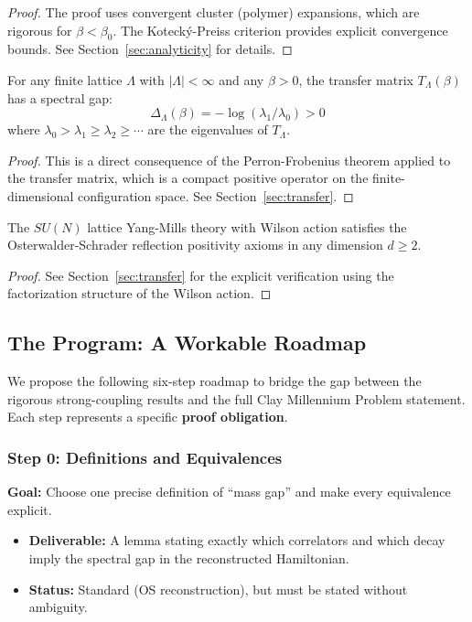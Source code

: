 \begin{proof}
The proof uses convergent cluster (polymer) expansions, which are rigorous for $\beta < \beta_0$. The Koteck\'y-Preiss criterion provides explicit convergence bounds. See Section~\ref{sec:analyticity} for details.
\end{proof}

\begin{theorem}
\label{thm:finite-volume-gap}
For any finite lattice $\Lambda$ with $|\Lambda| < \infty$ and any $\beta > 0$, the transfer matrix $T_\Lambda(\beta)$ has a spectral gap:
\[
\Delta_\Lambda(\beta) = -\log(\lambda_1/\lambda_0) > 0
\]
where $\lambda_0 > \lambda_1 \geq \lambda_2 \geq \cdots$ are the eigenvalues of $T_\Lambda$.
\end{theorem}

\begin{proof}
This is a direct consequence of the Perron-Frobenius theorem applied to the transfer matrix, which is a compact positive operator on the finite-dimensional configuration space. See Section~\ref{sec:transfer}.
\end{proof}

\begin{theorem}
\label{thm:rp-intro}
The $SU(N)$ lattice Yang-Mills theory with Wilson action satisfies the Osterwalder-Schrader reflection positivity axioms in any dimension $d \geq 2$.
\end{theorem}

\begin{proof}
See Section~\ref{sec:transfer} for the explicit verification using the factorization structure of the Wilson action.
\end{proof}

\subsection{The Program: A Workable Roadmap}
\label{sec:roadmap}

We propose the following six-step roadmap to bridge the gap between the rigorous strong-coupling results and the full Clay Millennium Problem statement. Each step represents a specific \textbf{proof obligation}.

\subsubsection*{Step 0: Definitions and Equivalences}
\textbf{Goal:} Choose one precise definition of ``mass gap'' and make every equivalence explicit.
\begin{itemize}
    \item \textbf{Deliverable:} A lemma stating exactly which correlators and which decay imply the spectral gap in the reconstructed Hamiltonian.
    \item \textbf{Status:} Standard (OS reconstruction), but must be stated without ambiguity.
\end{itemize}

